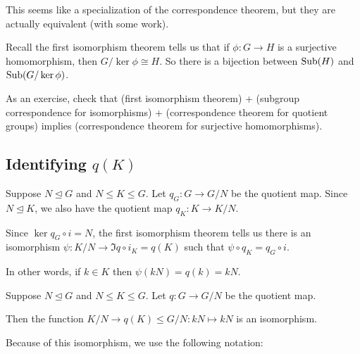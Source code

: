 \documentclass[12pt,letterpaper]{report}
\begin{document}
This seems like a specialization of the correspondence theorem, but they are actually equivalent
(with some work).

Recall the first isomorphism theorem tells us that if $\phi \colon G \to H$ is a surjective
homomorphism, then $G/\ker\phi \cong H$.
So there is a bijection between $\operatorname{Sub}(H)$ and $\operatorname{Sub}(G/\ker\phi)$.

As an exercise, check that (first isomorphism theorem) + (subgroup correspondence for isomorphisms)
+ (correspondence theorem for quotient groups) implies (correspondence theorem for surjective
homomorphisms).

\pagebreak
\subsection[Identifying q(K)]{Identifying $q(K)$}

Suppose $N \trianglelefteq G$ and $N \leq K \leq G$.
Let $q_G \colon G \to G/N$ be the quotient map.
Since $N \trianglelefteq K$, we also have the quotient map $q_K \colon K \to K/N$.

\begin{center}
\end{center}

Since $\ker q_G \circ i = N$, the first isomorphism theorem tells us there is an isomorphism
$\psi \colon K/N \to \Im q \circ i_K = q(K)$ such that $\psi \circ q_K = q_G \circ i$.

In other words, if $k \in K$ then $\psi(kN) = q(k) = kN$.

\begin{prop}{}{}
  Suppose $N \trianglelefteq G$ and $N \leq K \leq G$.
  Let $q \colon G \to G/N$ be the quotient map.

  Then the function $K/N \to q(K) \leq G/N \colon kN \mapsto kN$ is an isomorphism.
\end{prop}

Because of this isomorphism, we use the following notation:
\end{document}
